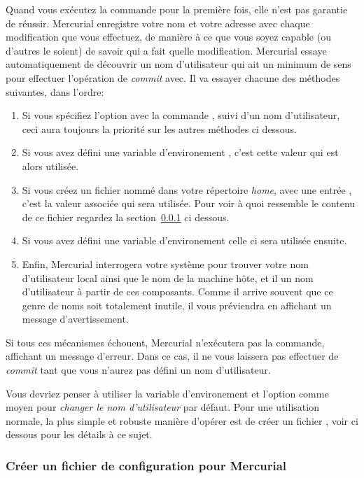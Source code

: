 Quand vous exécutez la commande  pour la première fois, elle
n'est pas garantie de réussir. Mercurial enregistre votre nom et votre 
adresse avec chaque modification que vous effectuez, de manière à ce que
vous soyez capable (ou d'autres le soient) de savoir qui a fait quelle
modification. Mercurial essaye automatiquement de découvrir un nom 
d'utilisateur qui ait un minimum de sens pour effectuer l'opération
de \textit{commit} avec. Il va essayer chacune des méthodes suivantes,
dans l'ordre:
\begin{enumerate}
\item Si vous spécifiez l'option  avec la commande 
  , suivi d'un nom d'utilisateur, ceci aura toujours la 
  priorité sur les autres méthodes ci dessous.
\item Si vous avez défini une variable d'environement , 
  c'est cette valeur qui est alors utilisée.
\item Si vous créez un fichier nommé  dans votre 
   répertoire \textit{home}, avec une entrée , 
   c'est la valeur associée qui sera utilisée. Pour voir à quoi 
   ressemble le contenu de ce fichier regardez la 
   section~\ref{sec:tour-basic:username} ci dessous.
\item Si vous avez défini une variable d'environement 
  celle ci sera utilisée ensuite.
\item Enfin, Mercurial interrogera votre système pour trouver votre
  nom d'utilisateur local ainsi que le nom de la machine hôte, et il 
  un nom d'utilisateur à partir de ces composants. Comme il arrive
  souvent que ce genre de noms soit totalement inutile, il vous 
  préviendra en affichant un message d'avertissement.
\end{enumerate}

Si tous ces mécanismes échouent, Mercurial n'exécutera pas la commande,
affichant un message d'erreur. Dans ce cas, il ne vous laissera pas 
effectuer de \textit{commit} tant que vous n'aurez pas défini un nom
d'utilisateur.

Vous devriez penser à utiliser la variable d'environement  
et l'option  comme moyen pour \emph{changer le nom
d'utilisateur} par défaut. Pour une utilisation normale, la plus simple
et robuste manière d'opérer est de créer un fichier ,
voir ci dessous pour les détails à ce sujet.

\subsubsection{Créer un fichier de configuration pour Mercurial}
\label{sec:tour-basic:username}

